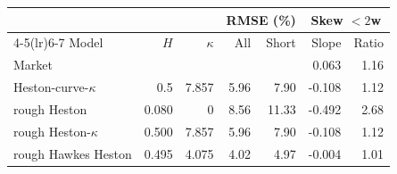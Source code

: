 \begin{tabular}{lrrrrrr}
\toprule
 & & & \multicolumn{2}{c}{RMSE (\%)} & \multicolumn{2}{c}{Skew $<2$w}\\
\cmidrule(lr){4-5}\cmidrule(lr){6-7}
Model & $H$ & $\kappa$ & All & Short & Slope & Ratio\\
\midrule
Market & & & & & 0.063 & 1.16\\
\addlinespace
Heston-curve-$\kappa$ & 0.5 & 7.857 & 5.96 & 7.90 & -0.108 & 1.12\\
rough Heston & 0.080 & 0 & 8.56 & 11.33 & -0.492 & 2.68\\
rough Heston-$\kappa$ & 0.500 & 7.857 & 5.96 & 7.90 & -0.108 & 1.12\\
rough Hawkes Heston & 0.495 & 4.075 & 4.02 & 4.97 & -0.004 & 1.01\\
\bottomrule
\end{tabular}
